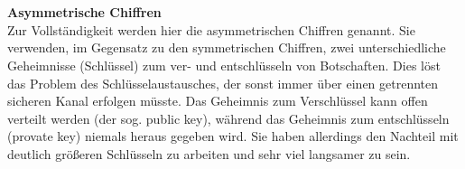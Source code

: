 \documentclass[13pt,a4paper,bibliography=totocnumbered,listof=totocnumbered]{scrartcl}
\begin{document}
\cite{6} \cite{7} \cite[S. 243f]{42} \cite[S. 93f]{48}\\
\\\textbf{Asymmetrische Chiffren}\\
Zur Vollständigkeit werden hier die asymmetrischen Chiffren genannt. Sie verwenden, im Gegensatz zu den symmetrischen Chiffren, zwei unterschiedliche Geheimnisse (Schlüssel) zum ver- und entschlüsseln von Botschaften. Dies löst das Problem des Schlüsselaustausches, der sonst immer über einen getrennten sicheren Kanal erfolgen müsste. Das Geheimnis zum Verschlüssel kann offen verteilt werden (der sog. public key), während das Geheimnis zum entschlüsseln (provate key) niemals heraus gegeben wird. Sie haben allerdings den Nachteil mit deutlich größeren Schlüsseln zu arbeiten und sehr viel langsamer zu sein.\\
\cite[S. 525]{42} \cite[S. 109]{48}
\end{document}
